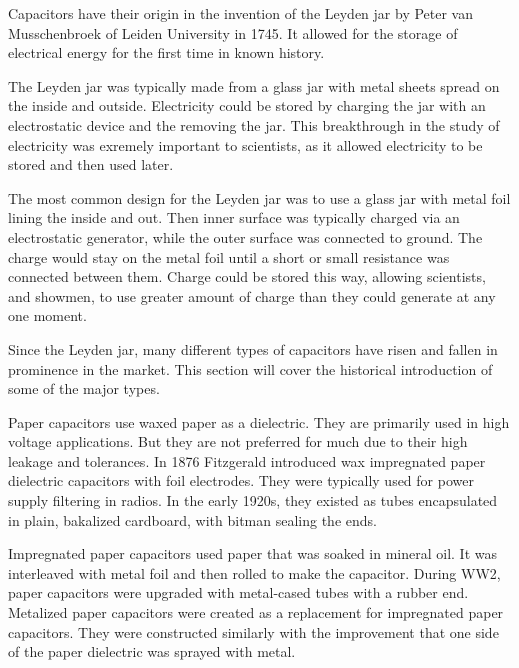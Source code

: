 \noindent Capacitors have their origin in the invention of the Leyden jar by Peter van Musschenbroek of Leiden University in 1745. \cite{empLight} It allowed for the storage of electrical energy for the first time in known history. 

\noindent The Leyden jar was typically made from a glass jar with metal sheets spread on the inside and outside. Electricity could be stored by charging the jar with an electrostatic device and the removing the jar. This breakthrough in the study of electricity was exremely important to scientists, as it allowed electricity to be stored and then used later.
\cite{ieee_hist} 

\noindent The most common design for the Leyden jar was to use a glass jar with metal foil lining the inside and out. Then inner surface was typically charged via an electrostatic generator, while the outer surface was connected to ground. The charge would stay on the metal foil until a short or small resistance was connected between them. Charge could be stored this way, allowing scientists, and showmen, to use greater amount of charge than they could generate at any one moment.

\noindent Since the Leyden jar, many different types of capacitors have risen and fallen in prominence in the market. This section will cover the historical introduction of some of the major types.

\noindent Paper capacitors use waxed paper as a dielectric. They are primarily used in high voltage applications. But they are not preferred for much due to their high leakage and tolerances.\cite{learn_caps} In 1876 Fitzgerald introduced wax impregnated paper dielectric capacitors with foil electrodes.\cite[ch.~11]{dumInv} \cite{learn_caps} They were typically used for power supply filtering in radios. In the early 1920s, they existed as tubes encapsulated in plain, bakalized cardboard, with bitman sealing the ends.\cite[ch~3]{dumInv}

\noindent Impregnated paper capacitors used paper that was soaked in mineral oil. It was interleaved with metal foil and then rolled to make the capacitor.\cite[ch.~8.2.1.1]{poorIntro} \noindent During WW2, paper capacitors were upgraded with metal-cased tubes with a rubber end.\cite[ch.~8.1]{poorIntro} Metalized paper capacitors were created as a replacement for impregnated paper capacitors. They were constructed similarly with the improvement that one side of the paper dielectric was sprayed with metal.\cite{hist_cerFilt}


